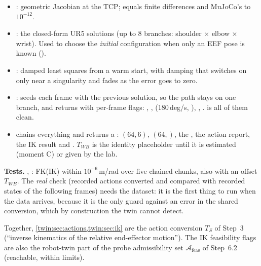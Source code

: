 \begin{incode}
\begin{itemize}[leftmargin=*]
\item {}: geometric Jacobian at the TCP; equals finite differences and MuJoCo's  to $10^{-12}$.
\item {}: the closed-form UR5 solutions (up to 8 branches: shoulder $\times$ elbow $\times$ wrist). Used to choose the \emph{initial} configuration when only an EEF pose is known ().
\item {}: damped least squares from a warm start, with damping that switches on only near a singularity and fades as the error goes to zero.
\item {}: seeds each frame with the previous solution, so the path stays on one branch, and returns  with per-frame flags: , ,  (180\,deg/s, \chk), , .  is all of them clean.
\item {} chains everything and returns a :  $(64,6)$,  $(64,)$, the , the action report, the IK result and . $T_{WB}$ is the identity placeholder until it is estimated (moment C) or given by the lab.
\end{itemize}
\end{incode}

\textbf{Tests.} , : FK(IK) within $10^{-6}$\,m/rad over five chained chunks, also with an offset $T_{WB}$. The \emph{real} check (recorded actions converted and compared with recorded states of the following frames) needs the dataset: it is the first thing to run when the data arrives, because it is the only guard against an error in the shared conversion, which by construction the twin cannot detect.

\begin{inprop}
Together, \cref{twin:sec:actions,twin:sec:ik} are the action conversion $T_S$ of Step~3 (``inverse kinematics of the relative end-effector motion''). The IK feasibility flags are also the robot-twin part of the probe admissibility set $\mathcal A_{\text{feas}}$ of Step~6.2 (reachable, within limits).
\end{inprop}

